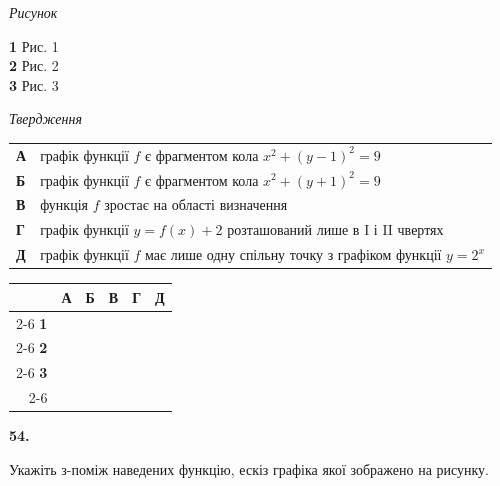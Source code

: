 \documentclass[14pt]{extarticle}
\newcommand{\answerGrid}{
    \begingroup
    \renewcommand{\arraystretch}{1.3} 
    \setlength{\tabcolsep}{7pt} 
    \begin{tabular}{r|c|c|c|c|c|}
         \multicolumn{1}{c}{} & \multicolumn{1}{c}{\textbf{А}} & \multicolumn{1}{c}{\textbf{Б}} & \multicolumn{1}{c}{\textbf{В}} & \multicolumn{1}{c}{\textbf{Г}} & \multicolumn{1}{c}{\textbf{Д}} \\ \cline{2-6}
         \textbf{1} & & & & & \\ \cline{2-6}
         \textbf{2} & & & & & \\ \cline{2-6}
         \textbf{3} & & & & & \\ \cline{2-6}
    \end{tabular}
    \endgroup
}
\begin{document}
\vspace{0.3cm}

\noindent
\begin{minipage}[t]{0.20\textwidth}
    \textit{Рисунок} \par \vspace{0.2cm}
    \textbf{1} \quad Рис. 1 \\[0.3cm]
    \textbf{2} \quad Рис. 2 \\[0.3cm]
    \textbf{3} \quad Рис. 3
\end{minipage}%
\hfill
\begin{minipage}[t]{0.50\textwidth}
    \textit{Твердження} \par \vspace{0.2cm}
    \begin{tabular}{@{}p{0.5cm} p{7cm}@{}}
    \textbf{А} & графік функції $f$ є фрагментом кола $x^2 + (y-1)^2 = 9$ \\[0.2cm]
    \textbf{Б} & графік функції $f$ є фрагментом кола $x^2 + (y+1)^2 = 9$ \\[0.2cm]
    \textbf{В} & функція $f$ зростає на області визначення \\[0.2cm]
    \textbf{Г} & графік функції $y=f(x)+2$ розташований лише в I і II чвертях \\[0.2cm]
    \textbf{Д} & графік функції $f$ має лише одну спільну точку з графіком функції $y=2^x$ \\
    \end{tabular}
\end{minipage}%
\hfill
\begin{minipage}[t]{0.25\textwidth}
    \vspace{0.5cm}
    \answerGrid
\end{minipage}

\vspace{0.7cm}

\noindent\textbf{54.} \begin{minipage}[t]{0.55\textwidth}
Укажіть з-поміж наведених функцію, ескіз графіка якої зображено на рисунку.
\end{minipage}
\hfill
\begin{minipage}[t]{0.4\textwidth}
    \vspace{-0.5cm}
    \begin{flushright}
    \end{flushright}
\end{minipage}
\end{document}
